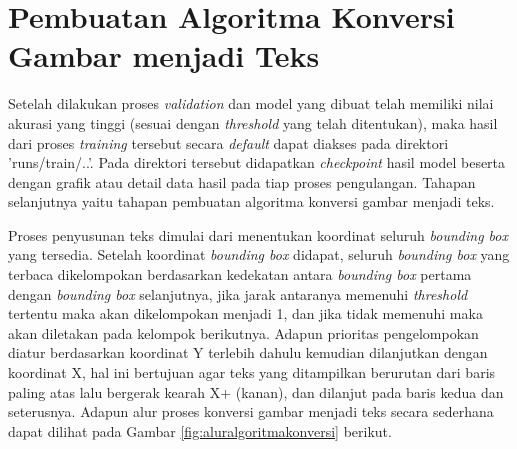 \section{Pembuatan Algoritma Konversi Gambar menjadi Teks}
\label{sec:pembuatanmodel}

Setelah dilakukan proses \textit{validation} dan model yang dibuat telah memiliki nilai akurasi yang tinggi (sesuai dengan \textit{threshold} yang telah ditentukan), maka hasil dari proses \textit{training} tersebut secara \textit{default} dapat diakses pada  direktori 'runs/train/..'. Pada direktori tersebut didapatkan \textit{checkpoint} hasil model beserta dengan grafik atau detail data hasil pada tiap proses pengulangan. Tahapan selanjutnya yaitu tahapan pembuatan algoritma konversi gambar menjadi teks.\par

Proses penyusunan teks dimulai dari menentukan koordinat seluruh \textit{bounding box} yang tersedia. Setelah koordinat \textit{bounding box} didapat, seluruh \textit{bounding box} yang terbaca dikelompokan berdasarkan kedekatan antara \textit{bounding box} pertama dengan \textit{bounding box} selanjutnya, jika jarak antaranya memenuhi \textit{threshold} tertentu maka akan dikelompokan menjadi 1, dan jika tidak memenuhi maka akan diletakan pada kelompok berikutnya. Adapun prioritas pengelompokan diatur berdasarkan koordinat Y terlebih dahulu kemudian dilanjutkan dengan koordinat X, hal ini bertujuan agar teks yang ditampilkan berurutan dari baris paling atas lalu bergerak kearah X+ (kanan), dan dilanjut pada baris kedua dan seterusnya.  Adapun alur proses konversi gambar menjadi teks secara sederhana dapat dilihat pada Gambar \ref*{fig:aluralgoritmakonversi} berikut.\par

